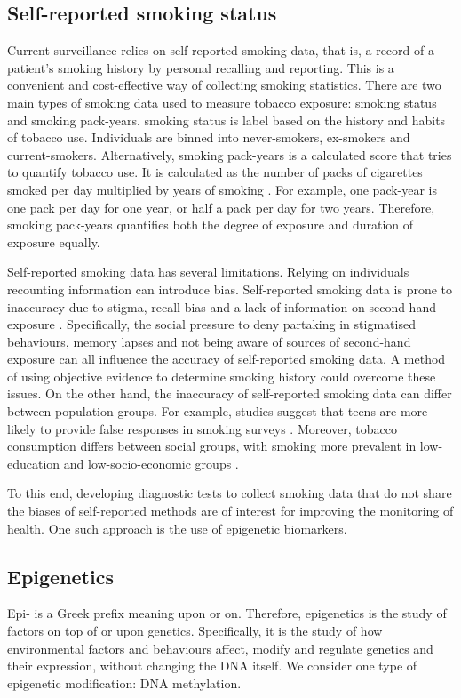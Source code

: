 \documentclass{article} %
\begin{document}
\subsection{Self-reported smoking status} \label{sec:srss}
Current surveillance relies on self-reported smoking data, that is, a record of a patient's smoking history by personal recalling and reporting. This is a convenient and cost-effective way of collecting smoking statistics. There are two main types of smoking data used to measure tobacco exposure: smoking status and smoking pack-years. smoking status is label based on the history and habits of tobacco use. Individuals are binned into never-smokers, ex-smokers and current-smokers. Alternatively, smoking pack-years is a calculated score that tries to quantify tobacco use. It is calculated as the number of packs of cigarettes smoked per day multiplied by years of smoking \cite{smokingpackyears}. For example, one pack-year is one pack per day for one year, or half a pack per day for two years. Therefore, smoking pack-years quantifies both the degree of exposure and duration of exposure equally.

Self-reported smoking data has several limitations. Relying on individuals recounting information can introduce bias. Self-reported smoking data is prone to inaccuracy due to stigma, recall bias and a lack of information on second-hand exposure \cite{park2015correlation, gorber2009accuracy}. Specifically, the social pressure to deny partaking in stigmatised behaviours, memory lapses and not being aware of sources of second-hand exposure can all influence the accuracy of self-reported smoking data. A method of using objective evidence to determine smoking history could overcome these issues. On the other hand, the inaccuracy of self-reported smoking data can differ between population groups. For example, studies suggest that teens are more likely to provide false responses in smoking surveys \cite{park2015correlation}. Moreover, tobacco consumption differs between social groups, with smoking more prevalent in low-education and low-socio-economic groups \cite{cdc2019_smoking}.

To this end, developing diagnostic tests to collect smoking data that do not share the biases of self-reported methods are of interest for improving the monitoring of health. One such approach is the use of epigenetic biomarkers.

\subsection{Epigenetics}
Epi- is a Greek prefix meaning upon or on. Therefore, epigenetics is the study of factors on top of or upon genetics. Specifically, it is the study of how environmental factors and behaviours affect, modify and regulate genetics and their expression, without changing the DNA itself. We consider one type of epigenetic modification: DNA methylation.
\end{document}
